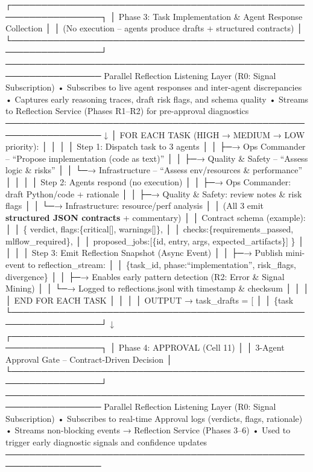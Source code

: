 \documentclass[
]{article}
\begin{document}
┌─────────────────────────────────────────────────────────────────┐ │
Phase 3: Task Implementation \& Agent Response Collection │ │ (No
execution -- agents produce drafts + structured contracts) │
└─────────────────────────────────────────────────────────────────┘
──────────────────────────────────────────────────────────────────
Parallel Reflection Listening Layer (R0: Signal Subscription) •
Subscribes to live agent responses and inter-agent discrepancies •
Captures early reasoning traces, draft risk flags, and schema quality •
Streams to Reflection Service (Phases R1--R2) for pre-approval
diagnostics
────────────────────────────────────────────────────────────────── ↓ │
FOR EACH TASK (HIGH → MEDIUM → LOW priority): │ │ │ │ Step 1: Dispatch
task to 3 agents │ │ ├─→ Ops Commander -- ``Propose implementation (code
as text)'' │ │ ├─→ Quality \& Safety -- ``Assess logic \& risks'' │ │
└─→ Infrastructure -- ``Assess env/resources \& performance'' │ │ │ │
Step 2: Agents respond (no execution) │ │ ├─→ Ops Commander: draft
Python/code + rationale │ │ ├─→ Quality \& Safety: review notes \& risk
flags │ │ └─→ Infrastructure: resource/perf analysis │ │ (All 3 emit
\textbf{structured JSON contracts} + commentary) │ │ Contract schema
(example): │ │ \{ verdict, flags:\{critical{[}{]}, warnings{[}{]}\}, │ │
checks:\{requirements\_passed, mlflow\_required\}, │ │
proposed\_jobs:{[}\{id, entry, args, expected\_artifacts\}{]} \} │ │ │ │
Step 3: Emit Reflection Snapshot (Async Event) │ │ ├─→ Publish
mini-event to reflection\_stream: │ │ \{task\_id,
phase:``implementation'', risk\_flags, divergence\} │ │ ├─→ Enables
early pattern detection (R2: Error \& Signal Mining) │ │ └─→ Logged to
reflections.jsonl with timestamp \& checksum │ │ │ │ END FOR EACH TASK │
│ │ │ OUTPUT → task\_drafts = {[} │ │ \{task
└─────────────────────────────────────────────────────────────────┘ ↓
┌─────────────────────────────────────────────────────────────────┐ │
Phase 4: APPROVAL (Cell 11) │ │ 3-Agent Approval Gate -- Contract-Driven
Decision │
└─────────────────────────────────────────────────────────────────┘
──────────────────────────────────────────────────────────────────
Parallel Reflection Listening Layer (R0: Signal Subscription) •
Subscribes to real-time Approval logs (verdicts, flags, rationale) •
Streams non-blocking events → Reflection Service (Phases 3--6) • Used to
trigger early diagnostic signals and confidence updates
──────────────────────────────────────────────────────────────────
\end{document}
